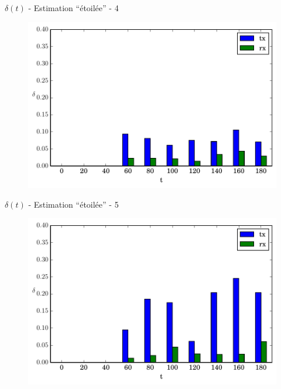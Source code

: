 \begin{frame}{$\delta(t)$ - Estimation ``étoilée'' - 4}
  \begin{figure}
    \centering  
    \includegraphics[width=\textwidth]{figures/evolution_noinfo_4.pdf}
  \end{figure}
\end{frame}

\begin{frame}{$\delta(t)$ - Estimation ``étoilée'' - 5}
  \begin{figure}
    \centering  
    \includegraphics[width=\textwidth]{figures/evolution_noinfo_5.pdf}
  \end{figure}
\end{frame}

